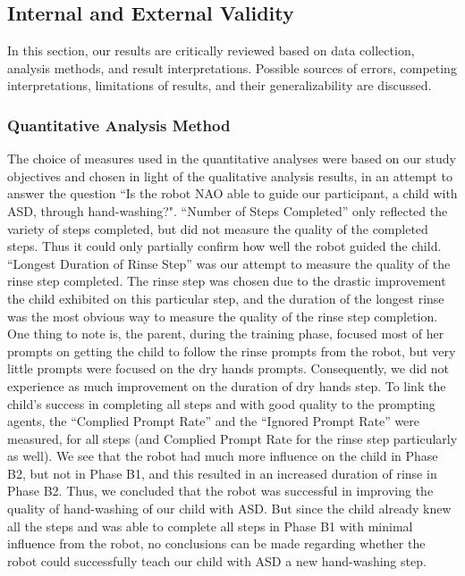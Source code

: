 \documentclass{ut-thesis}
\begin{document}
\subsection{Internal and External Validity}
In this section, our results are critically reviewed based on data collection, analysis methods, and result interpretations.  Possible sources of errors, competing interpretations, limitations of results, and their generalizability are discussed.

\subsubsection{Quantitative Analysis Method}
The choice of measures used in the quantitative analyses were based on our study objectives and chosen in light of the qualitative analysis results, in an attempt to answer the question ``Is the robot NAO able to guide our participant, a child with ASD, through hand-washing?".  ``Number of Steps Completed'' only reflected the variety of steps completed, but did not measure the quality of the completed steps.  Thus it could only partially confirm how well the robot guided the child.  ``Longest Duration of Rinse Step'' was our attempt to measure the quality of the rinse step completed.  The rinse step was chosen due to the drastic improvement the child exhibited on this particular step, and the duration of the longest rinse was the most obvious way to measure the quality of the rinse step completion.  One thing to note is, the parent, during the training phase, focused most of her prompts on getting the child to follow the rinse prompts from the robot, but very little prompts were focused on the dry hands prompts.  Consequently, we did not experience as much improvement on the duration of dry hands step.  To link the child's success in completing all steps and with good quality to the prompting agents, the ``Complied Prompt Rate'' and the ``Ignored Prompt Rate'' were measured, for all steps (and Complied Prompt Rate for the rinse step particularly as well).  We see that the robot had much more influence on the child in Phase B2, but not in Phase B1, and this resulted in an increased duration of rinse in Phase B2.  Thus, we concluded that the robot was successful in improving the quality of hand-washing of our child with ASD.  But since the child already knew all the steps and was able to complete all steps in Phase B1 with minimal influence from the robot, no conclusions can be made regarding whether the robot could successfully teach our child with ASD a new hand-washing step.
\end{document}
